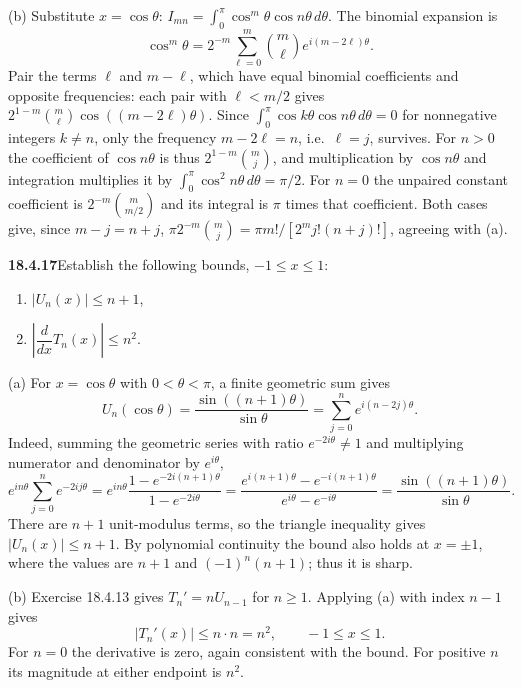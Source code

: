 (b) Substitute $x=\cos\theta$:
$I_{mn}=\int_0^\pi\cos^m\theta\cos n\theta\,d\theta$.
The binomial expansion is
\[
\cos^m\theta=2^{-m}\sum_{\ell=0}^m
       \binom m\ell e^{i(m-2\ell)\theta}.
\]
Pair the terms $\ell$ and $m-\ell$, which have equal binomial
coefficients and opposite frequencies: each pair with $\ell<m/2$
gives $2^{1-m}\binom m\ell\cos((m-2\ell)\theta)$.  Since
$\int_0^\pi\cos k\theta\cos n\theta\,d\theta=0$ for nonnegative
integers $k\ne n$, only the frequency $m-2\ell=n$, i.e.\ $\ell=j$,
survives.  For $n>0$ the coefficient of $\cos n\theta$ is thus
$2^{1-m}\binom mj$, and multiplication by $\cos n\theta$ and
integration multiplies it by $\int_0^\pi\cos^2n\theta\,d\theta=\pi/2$.
For $n=0$ the unpaired constant coefficient is
$2^{-m}\binom m{m/2}$ and its integral is $\pi$ times that
coefficient.  Both cases give, since $m-j=n+j$,
$\pi2^{-m}\binom mj=\pi m!/[2^mj!(n+j)!]$, agreeing with (a).

\par\bigskip
\noindent\textbf{18.4.17}\quad Establish the following bounds,
$-1\le x\le1$:
\begin{enumerate}
\item[(a)] $\big|U_{n}(x)\big|\le n+1$,
\item[(b)] $\left|\dfrac{d}{dx}T_{n}(x)\right|\le n^{2}$.
\end{enumerate}
\solution
(a) For $x=\cos\theta$ with $0<\theta<\pi$, a finite geometric
sum gives
\[
U_n(\cos\theta)
 =\frac{\sin((n+1)\theta)}{\sin\theta}
 =\sum_{j=0}^n e^{i(n-2j)\theta}.
\]
Indeed, summing the geometric series with ratio $e^{-2i\theta}\ne1$
and multiplying numerator and denominator by $e^{i\theta}$,
\[
e^{in\theta}\sum_{j=0}^ne^{-2ij\theta}
 =e^{in\theta}\frac{1-e^{-2i(n+1)\theta}}{1-e^{-2i\theta}}
 =\frac{e^{i(n+1)\theta}-e^{-i(n+1)\theta}}{e^{i\theta}-e^{-i\theta}}
 =\frac{\sin((n+1)\theta)}{\sin\theta}.
\]
There are $n+1$ unit-modulus terms, so the triangle inequality gives
$\boxed{|U_n(x)|\le n+1}$.  By polynomial continuity the bound
also holds at $x=\pm1$, where the values are $n+1$ and
$(-1)^n(n+1)$; thus it is sharp.

(b) Exercise 18.4.13 gives $T_n'=nU_{n-1}$ for $n\ge1$.
Applying (a) with index $n-1$ gives
\[
\boxed{|T_n'(x)|\le n\cdot n=n^2},\qquad -1\le x\le1.
\]
For $n=0$ the derivative is zero, again consistent with the bound.
For positive $n$ its magnitude at either endpoint is $n^2$.

